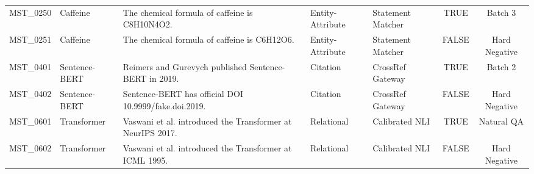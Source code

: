 \begin{table}[htbp]
{\begin{tabular}{lllllcc}
MST\_0250 & Caffeine & The chemical formula of caffeine is C8H10N4O2. & Entity-Attribute & Statement Matcher & TRUE & Batch 3 \\
MST\_0251 & Caffeine & The chemical formula of caffeine is C6H12O6. & Entity-Attribute & Statement Matcher & FALSE & Hard Negative \\
MST\_0401 & Sentence-BERT & Reimers and Gurevych published Sentence-BERT in 2019. & Citation & CrossRef Gateway & TRUE & Batch 2 \\
MST\_0402 & Sentence-BERT & Sentence-BERT has official DOI 10.9999/fake.doi.2019. & Citation & CrossRef Gateway & FALSE & Hard Negative \\
MST\_0601 & Transformer & Vaswani et al. introduced the Transformer at NeurIPS 2017. & Relational & Calibrated NLI & TRUE & Natural QA \\
MST\_0602 & Transformer & Vaswani et al. introduced the Transformer at ICML 1995. & Relational & Calibrated NLI & FALSE & Hard Negative \\
\bottomrule
\end{tabular}
}
\end{table}
